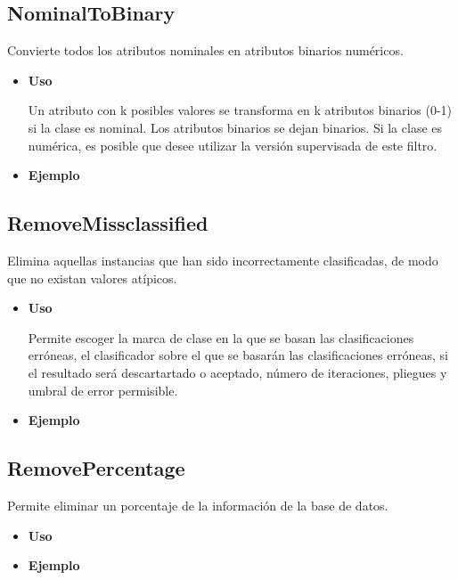 \newpage
	\subsection{NominalToBinary}
	\begin{justify}
	Convierte todos los atributos nominales en atributos binarios numéricos. 	
	\end{justify}
	\begin{itemize}
		\item \textbf{Uso}
	\begin{justify}
	Un atributo con k posibles valores se transforma en k atributos binarios (0-1) si la clase es nominal. Los atributos binarios se dejan binarios. Si la clase es numérica, es posible que desee utilizar la versión supervisada de este filtro.	
	\end{justify}
		\item \textbf{Ejemplo}
	\end{itemize}

	\subsection{RemoveMissclassified}
	\begin{justify}
	Elimina aquellas instancias que han sido incorrectamente clasificadas, de modo que no existan valores atípicos.
	\end{justify}
	\begin{itemize}
		\item \textbf{Uso}
	\begin{justify}
	Permite escoger la marca de clase en la que se basan las clasificaciones erróneas, el clasificador 	sobre el que se basarán las clasificaciones erróneas, si el resultado será descartartado o aceptado, número de iteraciones, pliegues y umbral de error permisible.
	\end{justify}
		\item \textbf{Ejemplo}
	\end{itemize}

	\subsection{RemovePercentage}
	\begin{justify}
	Permite eliminar un porcentaje de la información de la base de datos.
	\end{justify}
	\begin{itemize}
		\item \textbf{Uso}
	\begin{justify}

	\end{justify}
		\item \textbf{Ejemplo}
	\end{itemize}


